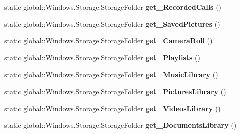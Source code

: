 \begin{DoxyCompactItemize}
\mbox{\label{class_windows_1_1_storage_1_1_known_folders_a02949a31d02148e80a3afd3aed34960d}} 
static global\+::\+Windows.\+Storage.\+Storage\+Folder {\bfseries get\+\_\+\+Recorded\+Calls} ()
\item 
\mbox{\label{class_windows_1_1_storage_1_1_known_folders_a4869671672489dd57931f6074817a15c}} 
static global\+::\+Windows.\+Storage.\+Storage\+Folder {\bfseries get\+\_\+\+Saved\+Pictures} ()
\item 
\mbox{\label{class_windows_1_1_storage_1_1_known_folders_a4e8edc457f8a28894740a09fc5dbe161}} 
static global\+::\+Windows.\+Storage.\+Storage\+Folder {\bfseries get\+\_\+\+Camera\+Roll} ()
\item 
\mbox{\label{class_windows_1_1_storage_1_1_known_folders_af660eb2549fc7f22379774000686d890}} 
static global\+::\+Windows.\+Storage.\+Storage\+Folder {\bfseries get\+\_\+\+Playlists} ()
\item 
\mbox{\label{class_windows_1_1_storage_1_1_known_folders_a385778d65001ff5821c5395815254772}} 
static global\+::\+Windows.\+Storage.\+Storage\+Folder {\bfseries get\+\_\+\+Music\+Library} ()
\item 
\mbox{\label{class_windows_1_1_storage_1_1_known_folders_a653b9b1f039c720de8b02e32d4139930}} 
static global\+::\+Windows.\+Storage.\+Storage\+Folder {\bfseries get\+\_\+\+Pictures\+Library} ()
\item 
\mbox{\label{class_windows_1_1_storage_1_1_known_folders_a4e637cb715e9d1600f05e297b1f73be7}} 
static global\+::\+Windows.\+Storage.\+Storage\+Folder {\bfseries get\+\_\+\+Videos\+Library} ()
\item 
\mbox{\label{class_windows_1_1_storage_1_1_known_folders_a46d0afa10b55b07fcbe5b69b12c6a351}} 
static global\+::\+Windows.\+Storage.\+Storage\+Folder {\bfseries get\+\_\+\+Documents\+Library} ()
\item 

\end{DoxyCompactItemize}
